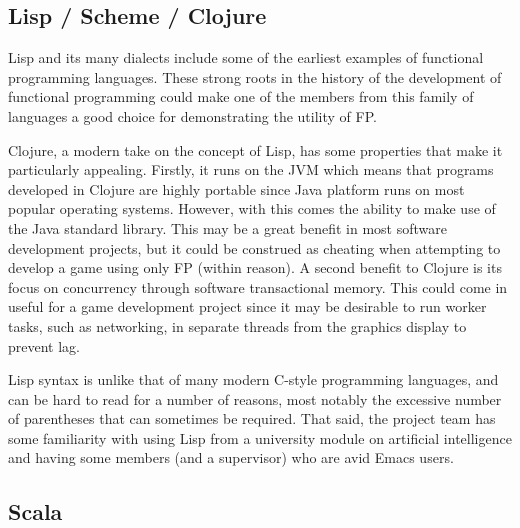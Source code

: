 \subsection{Lisp / Scheme / Clojure}




Lisp and its many dialects include some of the earliest examples of functional programming languages. These strong roots in the history of the development of functional programming could make one of the members from this family of languages a good choice for demonstrating the utility of FP.

Clojure, a modern take on the concept of Lisp, has some properties that make it particularly appealing. Firstly, it runs on the JVM which means that programs developed in Clojure are highly portable since Java platform runs on most popular operating systems. However, with this comes the ability to make use of the Java standard library. This may be a great benefit in most software development projects, but it could be construed as cheating when attempting to develop a game using only FP (within reason). A second benefit to Clojure is its focus on concurrency through software transactional memory. This could come in useful for a game development project since it may be desirable to run worker tasks, such as networking, in separate threads from the graphics display to prevent lag.

Lisp syntax is unlike that of many modern C-style programming languages, and can be hard to read for a number of reasons, most notably the excessive number of parentheses that can sometimes be required. That said, the project team has some familiarity with using Lisp from a university module on artificial intelligence and having some members (and a supervisor) who are avid Emacs users.

\subsection{Scala}



